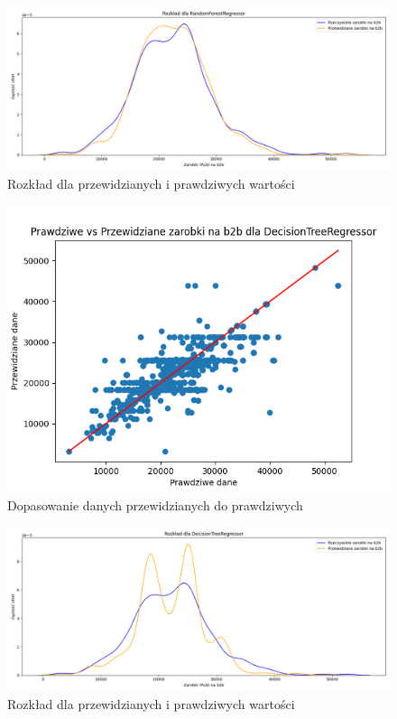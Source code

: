\documentclass[a4paper]{article}
\begin{document}
\begin{figure}[H]
    \centering
    \includegraphics[width=\textwidth]{../analysis/plots/wyniki/0.6&0.4/b2b/RandomForestRegressor/salary_dist.png}
    \caption{Rozkład dla przewidzianych i prawdziwych wartości}
\end{figure}

\begin{figure}[H]
    \centering
    \includegraphics[width=\textwidth]{../analysis/plots/wyniki/0.6&0.4/b2b/DecisionTreeRegressor/scatter.png}
    \caption{Dopasowanie danych przewidzianych do prawdziwych}
\end{figure}

\begin{figure}[H]
    \centering
    \includegraphics[width=\textwidth]{../analysis/plots/wyniki/0.6&0.4/b2b/DecisionTreeRegressor/salary_dist.png}
    \caption{Rozkład dla przewidzianych i prawdziwych wartości}
\end{figure}
\end{document}
